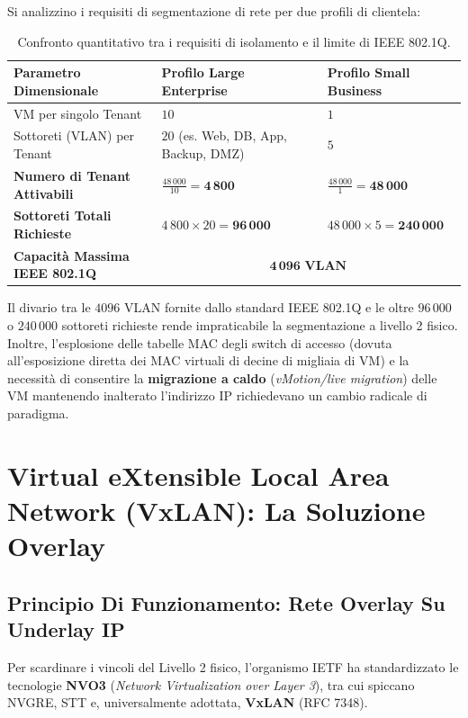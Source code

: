 \documentclass[11pt, a4paper]{article}
\begin{document}

Si analizzino i requisiti di segmentazione di rete per due profili di clientela:
\begin{table}[H]
\centering
\small
\begin{tabularx}{\textwidth}{l X X}
\toprule
\textbf{Parametro Dimensionale} & \textbf{Profilo Large Enterprise} & \textbf{Profilo Small Business} \\
\midrule
VM per singolo Tenant & $10$ & $1$ \\
Sottoreti (VLAN) per Tenant & $20$ (es. Web, DB, App, Backup, DMZ) & $5$ \\
\textbf{Numero di Tenant Attivabili} & $\frac{48\,000}{10} = \mathbf{4\,800}$ & $\frac{48\,000}{1} = \mathbf{48\,000}$ \\
\textbf{Sottoreti Totali Richieste} & $4\,800 \times 20 = \mathbf{96\,000}$ & $48\,000 \times 5 = \mathbf{240\,000}$ \\
\midrule
\textbf{Capacità Massima IEEE 802.1Q} & \multicolumn{2}{c}{$\mathbf{4\,096 \text{ VLAN}}$} \\
\bottomrule
\end{tabularx}
\caption{Confronto quantitativo tra i requisiti di isolamento e il limite di IEEE 802.1Q.}
\end{table}

Il divario tra le $4096$ VLAN fornite dallo standard IEEE 802.1Q e le oltre $96\,000$ o $240\,000$ sottoreti richieste rende impraticabile la segmentazione a livello 2 fisico. Inoltre, l'esplosione delle tabelle MAC degli switch di accesso (dovuta all'esposizione diretta dei MAC virtuali di decine di migliaia di VM) e la necessità di consentire la \textbf{migrazione a caldo} (\emph{vMotion/live migration}) delle VM mantenendo inalterato l'indirizzo IP richiedevano un cambio radicale di paradigma.

\newpage

\section{Virtual eXtensible Local Area Network (VxLAN): La Soluzione Overlay}

\subsection{Principio Di Funzionamento: Rete Overlay Su Underlay IP}
Per scardinare i vincoli del Livello 2 fisico, l'organismo IETF ha standardizzato le tecnologie \textbf{NVO3} (\emph{Network Virtualization over Layer 3}), tra cui spiccano NVGRE, STT e, universalmente adottata, \textbf{VxLAN} (RFC 7348).
\end{document}
